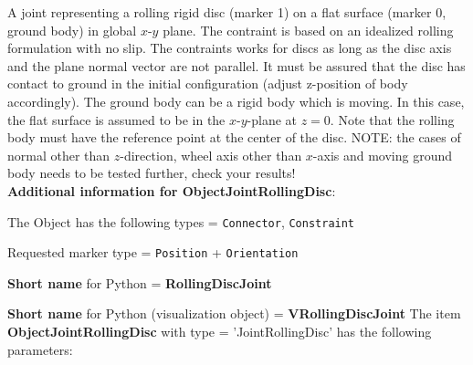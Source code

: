 \label{sec:item:ObjectJointRollingDisc}
A joint representing a rolling rigid disc (marker 1) on a flat surface (marker 0, ground body) in global $x$-$y$ plane. The contraint is based on an idealized rolling formulation with no slip. The contraints works for discs as long as the disc axis and the plane normal vector are not parallel. It must be assured that the disc has contact to ground in the initial configuration (adjust z-position of body accordingly). The ground body can be a rigid body which is moving. In this case, the flat surface is assumed to be in the $x$-$y$-plane at $z=0$. Note that the rolling body must have the reference point at the center of the disc. NOTE: the cases of normal other than $z$-direction, wheel axis other than $x$-axis and moving ground body needs to be tested further, check your results!\vspace{12pt}
 \\{\bf Additional information for ObjectJointRollingDisc}:
\bi
  \item The Object has the following types = \texttt{Connector}, \texttt{Constraint}
  \item Requested marker type = \texttt{Position} + \texttt{Orientation}
  \item {\bf Short name} for Python = {\bf RollingDiscJoint}  \item {\bf Short name} for Python (visualization object) = {\bf VRollingDiscJoint}\ei
\vspace{12pt} \noindent The item {\bf ObjectJointRollingDisc} with type = 'JointRollingDisc' has the following parameters:\vspace{-1cm}\\ 

